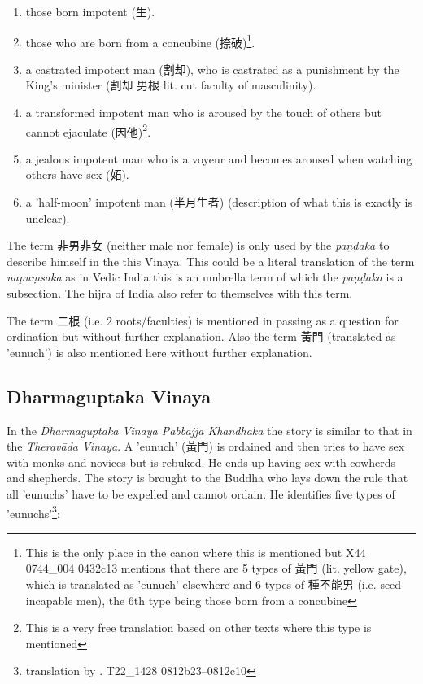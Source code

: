 \begin{enumerate}
\item those born impotent (生). 
\item those who are born from a concubine (捺破)\footnote{This is the only place in the canon where this is mentioned but X44 0744_004 0432c13 mentions that there are 5 types of 黃門 (lit. yellow gate), which is translated as 'eunuch' elsewhere and 6 types of 種不能男 (i.e. seed incapable men), the 6th type being those born from a concubine}.
\item a castrated impotent man (割却), who is castrated as a punishment by the King's minister (割却 男根 lit. cut faculty of masculinity).
\item a transformed impotent man who is aroused by the touch of others but cannot ejaculate (因他)\footnote{This is a very free translation based on other texts where this type is mentioned}.
\item a jealous impotent man who is a voyeur and becomes aroused when watching others have sex (妬).
\item a 'half-moon' impotent man (半月生者) (description of what this is exactly is unclear).
\end{enumerate}

The term 非男非女 (neither male nor female) is only used by the {\em paṇḍaka} to describe himself in the this Vinaya. This could be a literal translation of the term {\em napuṃsaka} as in Vedic India this is an umbrella term of which the {\em paṇḍaka} is a subsection. The hijra of India also refer to themselves with this term.

The term 二根 (i.e. 2 roots/faculties) is mentioned in passing as a question for ordination but without further explanation. Also the term 黃門 (translated as 'eunuch') is also mentioned here without further explanation.


\subsection{Dharmaguptaka Vinaya}
In the {\em Dharmaguptaka Vinaya Pabbajja Khandhaka} the story is similar to that in the {\em Theravāda Vinaya}. A 'eunuch' (黃門) is ordained and then tries to have sex with monks and novices but is rebuked. He ends up having sex with cowherds and shepherds. The story is brought to the Buddha who lays down the rule that all 'eunuchs' have to be expelled and cannot ordain. He identifies five types of 'eunuchs'\footnote{translation by \cite{bodhi}. T22_1428 0812b23–0812c10}: 

